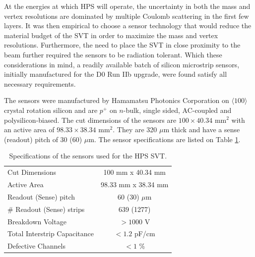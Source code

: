 At the energies at which HPS will operate, the uncertainty in both the mass and
vertex resolutions are dominated by multiple Coulomb scattering in the first 
few layers.  It was then empirical to choose a sensor technology that would 
reduce the material budget of the SVT in order to maximize the mass and vertex
resolutions.  Furthermore, the need to place the SVT in close proximity to the 
beam further required the sensors to be radiation tolerant.  Which these 
considerations in mind, a readily available batch of silicon microstrip sensors,
initially manufactured for the D0 Run IIb upgrade, were found satisfy all 
necessary requirements.

The sensors were manufactured by Hamamatsu Photonics Corporation on 
$\langle 100 \rangle$ crystal rotation silicon and are $p^{+}$ on $n$-bulk, 
single sided, AC-coupled and polysilicon-biased. The cut dimensions of the 
sensors are $100 \times 40.34$ mm$^{2}$ with an active area of 
$98.33 \times 38.34$ mm$^{2}$.  They are 320 $\mu$m thick and have a sense
(readout) pitch of 30 (60) $\mu$m. The sensor specifications are listed on 
Table \ref{tab:sensor_specs}.
\begin{table}[t]
    \centering
    \begin{tabular}{l|c}
        \hline
        Cut Dimensions & 100 mm x 40.34 mm \\
        Active Area & 98.33 mm x 38.34 mm \\
        Readout (Sense) pitch & 60 (30) $\mu$m \\
        \# Readout (Sense) strips & 639 (1277) \\
        Breakdown Voltage & $ > 1000$ V \\
        Total Interstrip Capacitance & $< 1.2$ pF/cm \\
        Defective Channels & $<1$ \% \\
        \hline
    \end{tabular}
    \caption{Specifications of the sensors used for the HPS SVT.}
    \label{tab:sensor_specs}
\end{table}

